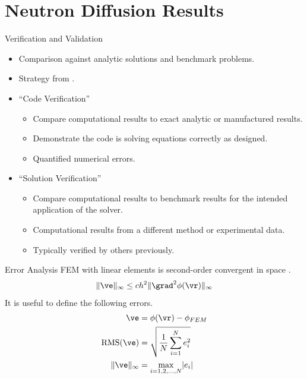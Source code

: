 \section{Neutron Diffusion Results}
\label{sec:diffusionResults}

\begin{frame}{Verification and Validation}
  \begin{itemize}
    \item Comparison against analytic solutions and benchmark problems.
    \item Strategy from \cite{oberkampf}.
    \item ``Code Verification''
      \begin{itemize}
        \item Compare computational results to exact analytic or manufactured
          results.
        \item Demonstrate the code is solving equations correctly as designed.
        \item Quantified numerical errors.
      \end{itemize}
    \item ``Solution Verification''
      \begin{itemize}
        \item Compare computational results to benchmark results for the
          intended application of the solver.
        \item Computational results from a different method or experimental
          data.
        \item Typically verified by others previously.
      \end{itemize}
  \end{itemize}
\end{frame}

\begin{frame}{Error Analysis}
  FEM with linear elements is second-order convergent in space
  \cite{textbookli}.
  \begin{equation} 
    \label{eq:error_bound}
    \|\ve\|_{\infty} \le c h^2 \| \grad^2 \phi(\vr) \|_{\infty}
  \end{equation}
  It is useful to define the following errors.
  \begin{align}
    \ve &= \phi(\vr) - \phi_{FEM} \\
    \label{eq:rms}
    \text{RMS}(\ve) &= \sqrt{\frac{1}{N} \sum_{i=1}^{N} e_i^2} \\
    \label{eq:infnorm}
    \|\ve\|_{\infty} &= \max_{i=1,2,\ldots,N} \lvert e_i \rvert
  \end{align}
\end{frame}

